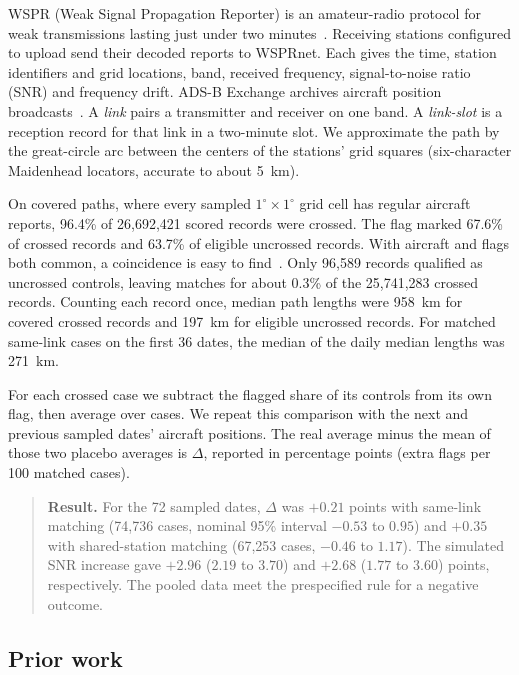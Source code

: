 \documentclass[11pt]{article}
\begin{document}
WSPR (Weak Signal Propagation Reporter) is an amateur-radio protocol for weak transmissions lasting just under two minutes~\cite{taylor}. Receiving stations configured to upload send their decoded reports to WSPRnet. Each gives the time, station identifiers and grid locations, band, received frequency, signal-to-noise ratio (SNR) and frequency drift. ADS-B Exchange archives aircraft position broadcasts~\cite{adsbx}. A \emph{link} pairs a transmitter and receiver on one band. A \emph{link-slot} is a reception record for that link in a two-minute slot. We approximate the path by the great-circle arc between the centers of the stations' grid squares (six-character Maidenhead locators, accurate to about 5~km).

On covered paths, where every sampled $1^\circ\times1^\circ$ grid cell has regular aircraft reports, 96.4\% of 26{,}692{,}421 scored records were crossed. The flag marked 67.6\% of crossed records and 63.7\% of eligible uncrossed records. With aircraft and flags both common, a coincidence is easy to find~\cite{loi}. Only 96{,}589 records qualified as uncrossed controls, leaving matches for about 0.3\% of the 25{,}741{,}283 crossed records. Counting each record once, median path lengths were 958~km for covered crossed records and 197~km for eligible uncrossed records. For matched same-link cases on the first 36 dates, the median of the daily median lengths was 271~km.

For each crossed case we subtract the flagged share of its controls from its own flag, then average over cases. We repeat this comparison with the next and previous sampled dates' aircraft positions. The real average minus the mean of those two placebo averages is $\Delta$, reported in percentage points (extra flags per 100 matched cases).

\begin{quote}
\textbf{Result.} For the 72 sampled dates, $\Delta$ was $+0.21$ points with same-link matching (74{,}736 cases, nominal 95\% interval $-0.53$ to $0.95$) and $+0.35$ with shared-station matching (67{,}253 cases, $-0.46$ to $1.17$). The simulated SNR increase gave $+2.96$ ($2.19$ to $3.70$) and $+2.68$ ($1.77$ to $3.60$) points, respectively. The pooled data meet the prespecified rule for a negative outcome.
\end{quote}

\subsection{Prior work}\label{sec:prior}
\end{document}
